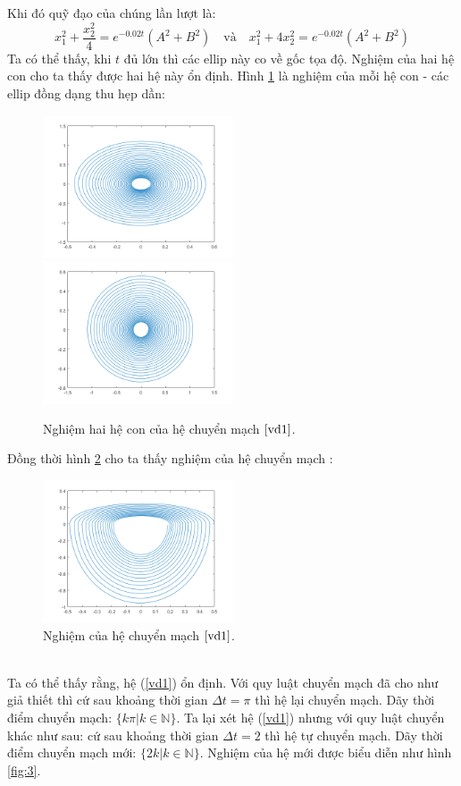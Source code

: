 \documentclass[14pt,a4paper,oneside]{report}		%
\theoremstyle{definition}
\begin{document}
Khi đó quỹ đạo của chúng lần lượt là:
$$
x^2_1 + \frac{x_2^2}{4} = e^{-0.02t}(A^2+B^2) \quad\text{và}\quad x^2_1 + 4x_2^2 = e^{-0.02t}(A^2+B^2)
$$
Ta có thể thấy, khi $t$ đủ lớn thì các ellip này co về gốc tọa độ. Nghiệm của hai hệ con cho ta thấy được hai hệ này ổn định. Hình \ref{fig:1} là nghiệm của mỗi hệ con - các ellip đồng dạng thu hẹp dần:
\begin{figure}[h]
\includegraphics[width=0.5\textwidth]{graph1.png}
\hspace{\fill}
\includegraphics[width=0.5\textwidth]{graph2.png}
\caption{Nghiệm hai hệ con của hệ chuyển mạch $\ref{vd1}$.}\label{fig:1}
\end{figure}
\newpage
Đồng thời hình \ref{fig:2} cho ta thấy nghiệm của hệ chuyển mạch :
\begin{figure}[h]
\centering
\includegraphics[width=0.5\textwidth]{graph3.png}
\caption{Nghiệm của hệ chuyển mạch $\ref{vd1}$.}\label{fig:2}
\end{figure}\\
Ta có thể thấy rằng, hệ (\ref{vd1}) ổn định. Với quy luật chuyển mạch đã cho như giả thiết thì cứ sau khoảng thời gian $\Delta t=\pi$ thì hệ lại chuyển mạch. Dãy thời điểm chuyển mạch: $\{k\pi | k\in\mathbb{N}\}$. Ta lại xét hệ (\ref{vd1}) nhưng với quy luật chuyển khác như sau: cứ sau khoảng thời gian $\Delta t=2$ thì hệ tự chuyển mạch. Dãy thời điểm chuyển mạch mới: $\{2k|k\in\mathbb{N}\}$. Nghiệm của hệ mới được biểu diễn như hình \ref{fig:3}.
\end{document}
